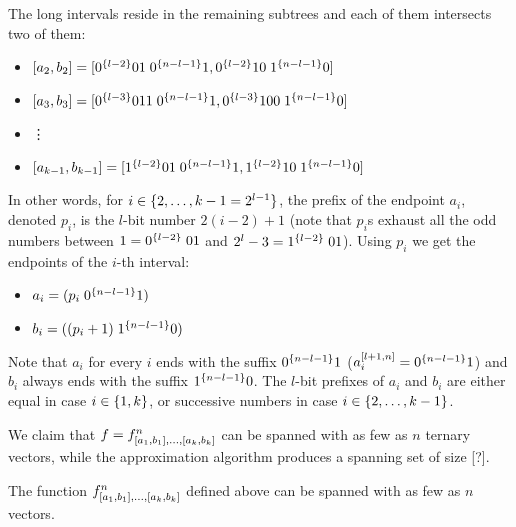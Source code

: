 The long intervals reside in the remaining subtrees
and each of them intersects two of them:

\begin{itemize}
\item
$[a_2, b_2] =
[0^{\{l-2\}} 01 \; 0^{\{n-l-1\}} 1, 0^{\{l-2\}} 10 \; 1^{\{n-l-1\}} 0]$
\item
$[a_3, b_3] =
[0^{\{l-3\}} 011 \; 0^{\{n-l-1\}} 1, 0^{\{l-3\}} 100 \; 1^{\{n-l-1\}} 0]$
\item \vdots
{}
\item
$[a_{k-1}, b_{k-1}] =
[1^{\{l-2\}} 01 \; 0^{\{n-l-1\}} 1, 1^{\{l-2\}} 10 \; 1^{\{n-l-1\}} 0]$
\end{itemize}

In other words,
for $i \in \{2, \ldots, k-1 = 2^{l-1}\}$,
the prefix of the endpoint $a_i$,
denoted $p_i$,
is the $l$-bit number $2 (i-2) + 1$
(note that $p_i$s exhaust all the odd numbers
between $1 = 0^{\{l-2\}} \; 01$
and $2^l - 3 = 1^{\{l-2\}} \; 01$).
Using $p_i$ we get the endpoints of the $i$-th interval:

\begin{itemize}
\item $a_i = (p_i \; 0^{\{n-l-1\}} 1)$
\item $b_i = ((p_i + 1) \; 1^{\{n-l-1\}} 0)$
\end{itemize}

Note that $a_i$ for every $i$
ends with the suffix $0^{\{n-l-1\}} 1$
($a_i^{[l+1, n]} = 0^{\{n-l-1\}} 1$)
and $b_i$ always ends with the suffix $1^{\{n-l-1\}} 0$.
The $l$-bit prefixes of $a_i$ and $b_i$
are either equal
in case $i \in \{1, k\}$,
or successive numbers in case
$i \in \{2, \ldots, k-1\}$.

We claim that $f =
f^n_{[a_1, b_1], \ldots, [a_k, b_k]}$
can be spanned with as few as $n$
ternary vectors,
while the approximation algorithm produces a spanning set
of size [?].

\begin{lemma}
The function
$f^n_{[a_1, b_1], \ldots, [a_k, b_k]}$
defined above can be spanned with as few as $n$ vectors.
\end{lemma}

